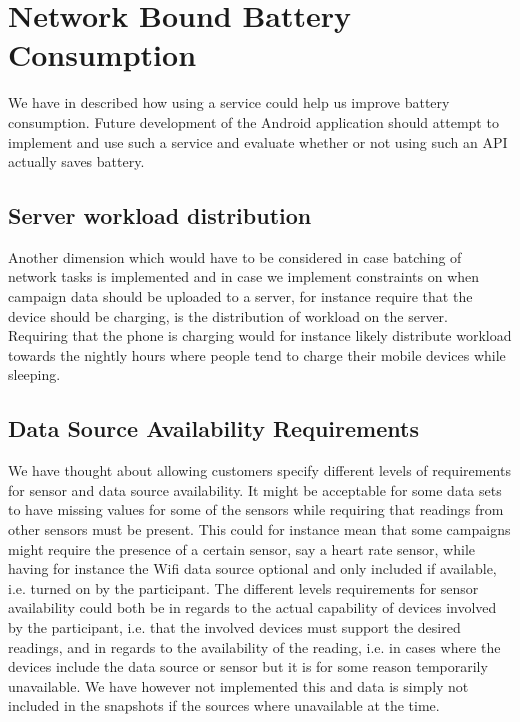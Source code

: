 
\section{Network Bound Battery Consumption}
\label{sec:future_work_network_bound_battery_consumption}

We have in  described how using a  service could help us improve battery consumption. Future development of the Android application should attempt to implement and use such a service and evaluate whether or not using such an API actually saves battery.

\subsection{Server workload distribution}

Another dimension which would have to be considered in case batching of network tasks is implemented and in case we implement constraints on when campaign data should be uploaded to a server, for instance require that the device should be charging, is the distribution of workload on the server. Requiring that the phone is charging would for instance likely distribute workload towards the nightly hours where people tend to charge their mobile devices while sleeping.  

\subsection{Data Source Availability Requirements}

We have thought about allowing customers specify different levels of requirements for sensor and data source availability. It might be acceptable for some data sets to have missing values for some of the sensors while requiring that readings from other sensors must be present. This could for instance mean that some campaigns might require the presence of a certain sensor, say a heart rate sensor, while having for instance the Wifi data source optional and only included if available, i.e. turned on by the participant. The different levels requirements for sensor availability could both be in regards to the actual capability of devices involved by the participant, i.e. that the involved devices must support the desired readings, and in regards to the availability of the reading, i.e. in cases where the devices include the data source or sensor but it is for some reason temporarily unavailable. We have however not implemented this and data is simply not included in the snapshots if the sources where unavailable at the time.
